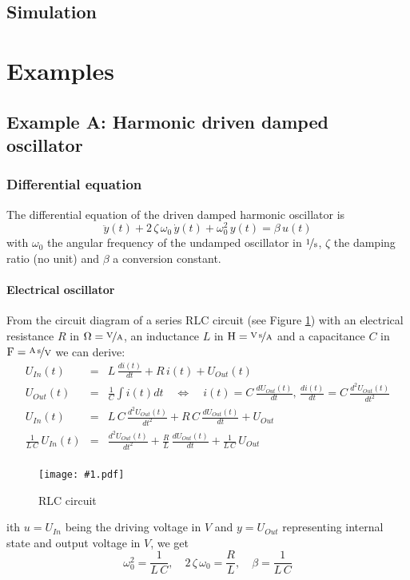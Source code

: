 \documentclass[a4paper,12pt]{article}
\newcommand{\Fig}[4]{%
\begin{figure}[htb]%
\begin{center}%
\texttt{[image: \#1.pdf]}%
\end{center}%
\caption{#3\label{fig:#1}}%
\end{figure}%
}
\newcommand{\FigRef}[1]{Figure \ref{fig:#1}}
\newcommand{\pfrac}[2]{\frac{#1}{#2}}
\newcommand{\Section}[2]{\section{#2}\label{section:#1}}
\newcommand{\SubSection}[2]{\subsection{#2}\label{subsection:#1}}
\newcommand{\SubSubSection}[2]{\subsubsection{#2}\label{subsubsection:#1}}
\begin{document}
\SubSection{simu}{Simulation}






\Section{examples}{Examples}

\SubSection{oscillator}{Example A: Harmonic driven damped oscillator}

\SubSubSection{diffeqA}{Differential equation}

The differential equation of the driven damped harmonic oscillator is
\begin{equation}
\ddot{y}(t)+2\,\zeta\,\omega_0\,\dot{y}(t)+\omega_0^2\,y(t)=\beta\,u(t)
\end{equation}
with $\omega_0$ the angular frequency of the undamped oscillator in
$\unitfrac{1}{s}$, $\zeta$ the damping ratio (no unit) and $\beta$ a
conversion constant.\\

\paragraph{Electrical oscillator}

From the circuit diagram of a series RLC circuit (see \FigRef{elecoscil}) with
an electrical resistance $R$ in $\unit{\Omega}=\unitfrac{V}{A}$, an inductance
$L$ in $\unit{H}=\unitfrac{V\,s}{A}$ and a capacitance $C$ in
$\unit{F}=\unitfrac{A\,s}{V}$ we can derive:
\begin{eqnarray}
U_{In}(t)&=&L\,\frac{di(t)}{dt}+R\,i(t)+U_{Out}(t)\\
U_{Out}(t)&=&\frac{1}{C}\int i(t)dt\quad\Leftrightarrow\quad i(t)=C\,\frac{dU_{Out}(t)}{dt},\,\frac{di(t)}{dt}=C\,\frac{d^2U_{Out}(t)}{dt^2}\\
U_{In}(t)&=&L\,C\,\frac{d^2U_{Out}(t)}{dt^2}+R\,C\,\frac{dU_{Out}(t)}{dt}+U_{Out}\\
\frac{1}{L\,C}\,U_{In}(t)&=&\frac{d^2U_{Out}(t)}{dt^2}+\frac{R}{L}\,\frac{dU_{Out}(t)}{dt}+\frac{1}{L\,C}\,U_{Out}\\
\end{eqnarray}

\Fig{elecoscil}{0.5}{RLC circuit}

With $u=U_{In}$ being the driving voltage in $\unit{V}$ and $y=U_{Out}$
representing internal state and output voltage in $\unit{V}$, we get
\begin{equation}
\omega_0^2=\pfrac{1}{L\,C},\quad2\,\zeta\,\omega_0=\pfrac{R}{L},\quad\beta=\pfrac{1}{L\,C}
\end{equation}
\end{document}
